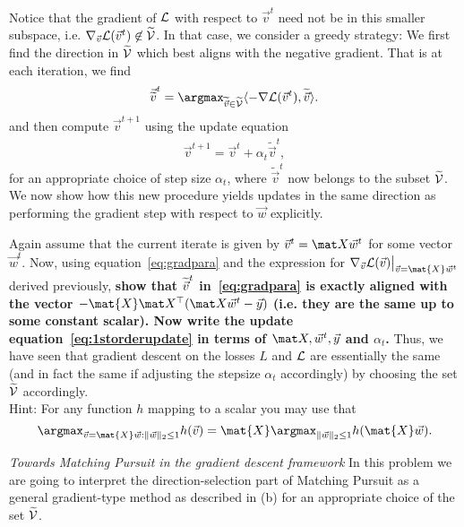 \documentclass[preview]{standalone}
\begin{document}
\begin{Parts}
  Notice that the gradient of $\mathcal{L}$
with respect to $\vec v^{t}$ need not be in this smaller subspace,
i.e. $\nabla_{\vec{v}} \mathcal{L}(\vec{v}^t) \not \in \widetilde{\mathcal{V}}$.
In that case, we consider a greedy strategy: We first
find the direction in $\widetilde{\mathcal{V}}$ which best aligns with 
the negative gradient. That is at each iteration, we find
\begin{align}
  \label{eq:gradpara}
    \vec{\widetilde{v}}^t = \argmax_{\tilvecv \in \widetilde{\Vspace}} \langle - \nabla \Loss(\vec{v}^t), \tilvecv  \rangle.
\end{align}
and then compute $\vec v^{t+1}$ using the update equation 
\begin{align}
\label{eq:1storderupdate}
  \vec v^{t+1} = \vec v^t + \alpha_t \widetilde{\vec v}^t,
\end{align}
for an appropriate choice of step size $\alpha_t$, where $\widetilde{\vec {v}}^t$ now belongs to the subset $\widetilde{\mathcal{V}}$.
We now show how this new procedure yields updates in the same direction
as performing the gradient step with respect to $\vec w$ explicitly.

Again assume that the current iterate is given by $\vec v^t = \mat X
\vec w^t$ for some vector $\vec w^t$.  Now, using
equation~\eqref{eq:gradpara} and the expression for $\nabla_{\vec v}
\Loss(\vec{v})\big \vert_{\vec{v} = \mat{X}\vec{w}^t}$ derived
previously, {\bf show that $\widetilde{\vec{v}}^t$ in~\eqref{eq:gradpara} is
  exactly aligned with the vector $-\mat{X} \mat X^\top (\mat X \vec
  w^t - \vec y)$ (i.e. they are the same up to some constant scalar).
  Now write the update equation~\eqref{eq:1storderupdate} in terms of
  $\mat X, \vec w^t, \vec y $ and $\alpha_t$.}
          Thus, we have seen that gradient descent on the losses
  $L$ and $\mathcal{L}$ are essentially the same (and in fact the same if
  adjusting the stepsize $\alpha_t$ accordingly) by choosing the set
  $\widetilde{\mathcal{V}}$ accordingly.\\

Hint: For any function $h$ mapping to a scalar you may use that
\begin{equation*}
  \argmax_{\vec{v} = \mat{X}\vec{w}: \|\vec{w}\|_2 \leq 1}h(\vec{v}) = \mat{X}\argmax_{\|\vec{w}\|_2\leq 1} h(\mat{X}\vec{w}).
\end{equation*}




\Part \emph{Towards Matching Pursuit in the gradient descent framework} In this
  problem we are going to interpret the direction-selection part of
  Matching Pursuit as a general gradient-type  method as described in
  (b) for an appropriate choice of the set $\widetilde{\mathcal{V}}$.


\end{Parts}
\end{document}
